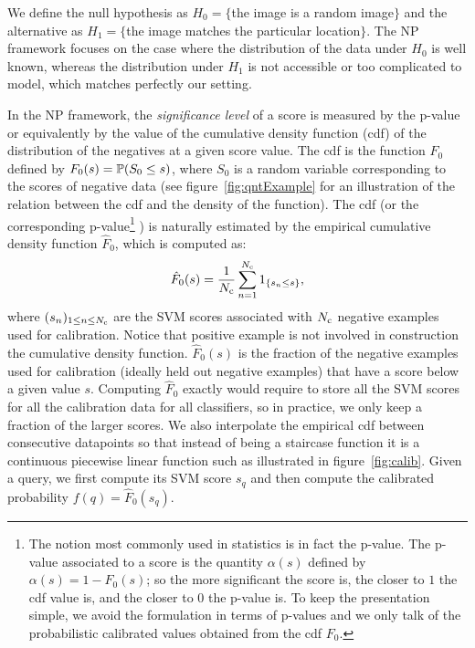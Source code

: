       We define the null hypothesis as $H_0=\{$the image is a random image$\}$ and the alternative as $H_1=\{$the image matches the particular location$\}$. The NP framework focuses on the case where the distribution of the data under $H_0$ is well known, whereas the distribution under $H_1$ is not accessible or too complicated to model, which matches perfectly our setting.

      In the NP framework, the \emph{significance level} of a score is measured by the p-value or equivalently by the value of the cumulative density function  (cdf) of the distribution of the negatives at a given score value. The cdf is the function $F_0$ defined by $F_0(s)=\mathbb{P}(S_0\leq s)$, where $S_0$ is a random variable corresponding to the scores of negative data (see figure~\ref{fig:qntExample} for an illustration of the relation between the cdf and the density of the function). The cdf 
      (or the corresponding p-value\footnote{
        The notion most commonly used in statistics is in fact the p-value. The p-value associated to a score is the quantity $\alpha(s)$ defined by $\alpha(s)=1-F_0(s)$; so the more significant the score is, the closer to $1$ the cdf value is, and the closer to $0$ the p-value is. To keep the presentation simple, we avoid the formulation in terms of p-values and we only talk of the probabilistic calibrated values obtained from the cdf $F_0$.
       }
      )
      is naturally estimated by the empirical cumulative density function $\hat{F}_0$, which is computed as: 
      \begin{equation}
        \hat{F}_0(s)=\frac{1}{N_{\text{c}}} \sum_{n=1}^{N_{\text{c}}} 1_{\{s_n \leq s\}},
        \label{eq:empiricalCDF}
      \end{equation}
      \noindent
      where $(s_n)_{1\leq n \leq N_{\text{c}} }$ are the SVM scores associated with $N_{\text{c}}$ negative examples used for calibration. \textcolor{petr}{Notice that positive example is not involved in construction the cumulative density function.}
      $\hat{F}_0(s)$ 
      is the fraction of the negative examples used for calibration (ideally held out negative examples) that have a score below a given value $s$.
      Computing $\hat{F}_0$ exactly would require to store all the SVM scores for all the calibration data for all classifiers, so in practice, we only keep a fraction of the larger scores.
      We also interpolate the empirical cdf between consecutive datapoints so that instead of being a staircase function it is a continuous piecewise linear function such as illustrated in figure~\ref{fig:calib}. Given a query, we first compute its SVM score $s_q$ and then compute the calibrated probability $f(q)=\hat{F}_0(s_q)$.
